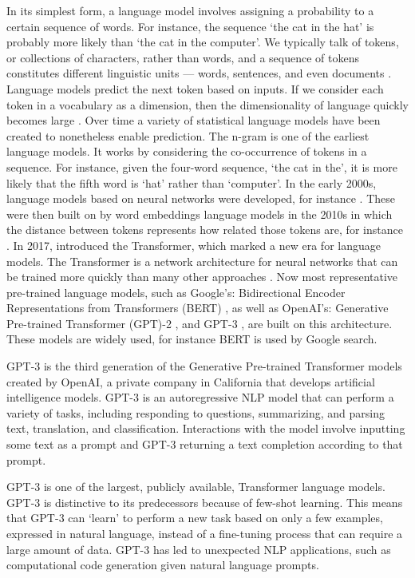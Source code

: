 \documentclass{bmcart}
\begin{document}
In its simplest form, a language model involves assigning a probability to a certain sequence of words. For instance, the sequence `the cat in the hat' is probably more likely than `the cat in the computer'. We typically talk of tokens, or collections of characters, rather than words, and a sequence of tokens constitutes different linguistic units --- words, sentences, and even documents \cite{bengio2003neural}. Language models predict the next token based on inputs. If we consider each token in a vocabulary as a dimension, then the dimensionality of language quickly becomes large \cite{rosenfeld2000two}. Over time a variety of statistical language models have been created to nonetheless enable prediction. The n-gram is one of the earliest language models. It works by considering the co-occurrence of tokens in a sequence. For instance, given the four-word sequence, `the cat in the', it is more likely that the fifth word is `hat' rather than `computer'. In the early 2000s, language models based on neural networks were developed, for instance \cite{bengio2003neural}. These were then built on by word embeddings language models in the 2010s in which the distance between tokens represents how related those tokens are, for instance \cite{turian2010word}. In 2017, \cite{vaswani2017attention} introduced the Transformer, which marked a new era for language models. The Transformer is a network architecture for neural networks that can be trained more quickly than many other approaches \cite{vaswani2017attention}. Now most representative pre-trained language models, such as Google's: Bidirectional Encoder Representations from Transformers (BERT) \cite{devlin2018bert}, as well as OpenAI's: Generative Pre-trained Transformer (GPT)-2 \cite{radford2019language}, and GPT-3 \cite{brown2020language}, are built on this architecture. These models are widely used, for instance BERT is used by Google search.

GPT-3 is the third generation of the Generative Pre-trained Transformer models created by OpenAI, a private company in California that develops artificial intelligence models. GPT-3 is an autoregressive NLP model that can perform a variety of tasks, including responding to questions, summarizing, and parsing text, translation, and classification. Interactions with the model involve inputting some text as a prompt and GPT-3 returning a text completion according to that prompt.

GPT-3 is one of the largest, publicly available, Transformer language models. GPT-3 is distinctive to its predecessors because of few-shot learning. This means that GPT-3 can `learn' to perform a new task based on only a few examples, expressed in natural language, instead of a fine-tuning process that can require a large amount of data. GPT-3 has led to unexpected NLP applications, such as computational code generation given natural language prompts.
\end{document}

